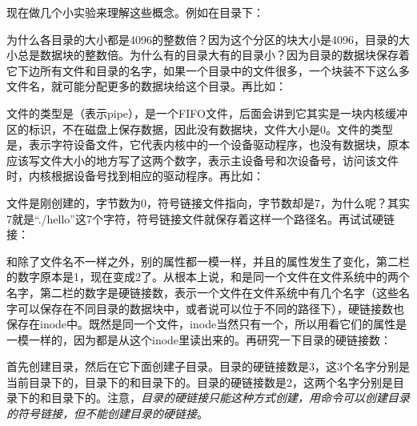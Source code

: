 现在做几个小实验来理解这些概念。例如在目录下：




为什么各目录的大小都是4096的整数倍？因为这个分区的块大小是4096，目录的大小总是数据块的整数倍。为什么有的目录大有的目录小？因为目录的数据块保存着它下边所有文件和目录的名字，如果一个目录中的文件很多，一个块装不下这么多文件名，就可能分配更多的数据块给这个目录。再比如：




文件的类型是（表示pipe），是一个FIFO文件，后面会讲到它其实是一块内核缓冲区的标识，不在磁盘上保存数据，因此没有数据块，文件大小是0。文件的类型是，表示字符设备文件，它代表内核中的一个设备驱动程序，也没有数据块，原本应该写文件大小的地方写了这两个数字，表示主设备号和次设备号，访问该文件时，内核根据设备号找到相应的驱动程序。再比如：




文件是刚创建的，字节数为0，符号链接文件指向，字节数却是7，为什么呢？其实7就是“./hello”这7个字符，符号链接文件就保存着这样一个路径名。再试试硬链接：




和除了文件名不一样之外，别的属性都一模一样，并且的属性发生了变化，第二栏的数字原本是1，现在变成2了。从根本上说，和是同一个文件在文件系统中的两个名字，第二栏的数字是硬链接数，表示一个文件在文件系统中有几个名字（这些名字可以保存在不同目录的数据块中，或者说可以位于不同的路径下），硬链接数也保存在inode中。既然是同一个文件，inode当然只有一个，所以用看它们的属性是一模一样的，因为都是从这个inode里读出来的。再研究一下目录的硬链接数：




首先创建目录，然后在它下面创建子目录。目录的硬链接数是3，这3个名字分别是当前目录下的，目录下的和目录下的。目录的硬链接数是2，这两个名字分别是目录下的和目录下的。注意，\emph{目录的硬链接只能这种方式创建，用命令可以创建目录的符号链接，但不能创建目录的硬链接}。


